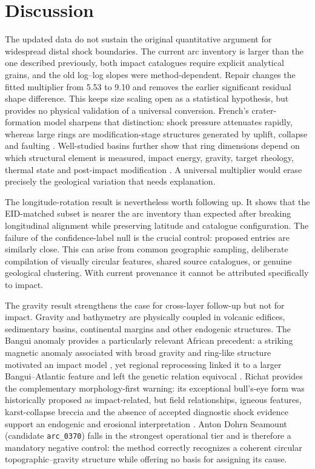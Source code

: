 \documentclass[11pt]{article}
\begin{document}
\section{Discussion}
The updated data do not sustain the original quantitative argument for widespread distal shock boundaries. The current arc inventory is larger than the one described previously, both impact catalogues require explicit analytical grains, and the old log--log slopes were method-dependent. Repair changes the fitted multiplier from 5.53 to 9.10 and removes the earlier significant residual shape difference. This keeps size scaling open as a statistical hypothesis, but provides no physical validation of a universal conversion. French's crater-formation model sharpens that distinction: shock pressure attenuates rapidly, whereas large rings are modification-stage structures generated by uplift, collapse and faulting \cite[pp.~18--29]{French1998}. Well-studied basins further show that ring dimensions depend on which structural element is measured, impact energy, gravity, target rheology, thermal state and post-impact modification \cite{French1998,Potter2013,Gulick2013}. A universal multiplier would erase precisely the geological variation that needs explanation.

The longitude-rotation result is nevertheless worth following up. It shows that the EID-matched subset is nearer the arc inventory than expected after breaking longitudinal alignment while preserving latitude and catalogue configuration. The failure of the confidence-label null is the crucial control: proposed entries are similarly close. This can arise from common geographic sampling, deliberate compilation of visually circular features, shared source catalogues, or genuine geological clustering. With current provenance it cannot be attributed specifically to impact.

The gravity result strengthens the case for cross-layer follow-up but not for impact. Gravity and bathymetry are physically coupled in volcanic edifices, sedimentary basins, continental margins and other endogenic structures. The Bangui anomaly provides a particularly relevant African precedent: a striking magnetic anomaly associated with broad gravity and ring-like structure motivated an impact model \cite{Girdler1992}, yet regional reprocessing linked it to a larger Bangui--Atlantic feature and left the genetic relation equivocal \cite{ReimoldKoeberl2014}. Richat provides the complementary morphology-first warning: its exceptional bull's-eye form was historically proposed as impact-related, but field relationships, igneous features, karst-collapse breccia and the absence of accepted diagnostic shock evidence support an endogenic and erosional interpretation \cite{ReimoldKoeberl2014}. Anton Dohrn Seamount (candidate \texttt{arc\_0370}) falls in the strongest operational tier and is therefore a mandatory negative control: the method correctly recognizes a coherent circular topographic--gravity structure while offering no basis for assigning its cause.
\end{document}
